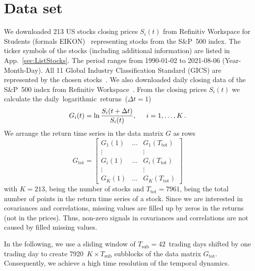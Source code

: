 \documentclass[aps, pra, groupedaddress, showkeys, twocolumn, floatfix, 10pt]{revtex4-2}
\begin{document}
\section{\label{sec:DataSet}Data set}


We downloaded 213 US stocks closing prices $S_i(t)$ from Refinitiv Workspace for Students (formals EIKON)~\cite{Refinitiv} representing stocks from the S\&P~500 index. 
The ticker symbols of the stocks (including additional information) are listed in App.~\ref{sec:ListStocks}.
The period ranges from \mbox{1990-01-02} to \mbox{2021-08-06} (Year-Month-Day).
All 11 Global Industry Classification Standard (GICS) are represented by the chosen stocks~\cite{wiki:2020:GICS}.
We also downloaded daily closing data of the S\&P~500 index from Refinitiv Workspace~\cite{Refinitiv}.
From the closing prices $S_i(t)$ we calculate the \mbox{daily logarithmic returns ($\Delta t = 1$)}
%
\begin{equation} \label{eqn:LogReturn}
	G_i(t) =  \ln  \frac{S_i(t+\Delta t)}{S_i(t)} , \hspace{0.5cm} i = 1, 
	\ldots, K
	\,.
\end{equation}
%
We arrange the return time series in the data matrix $G$ as rows
\begin{equation} \label{eqn:DatamatrixG}
	G_{\text{tot}} = \begin{bmatrix}  G_1(1) & \dots & G_1(T_{\text{tot}})  \\
		\vdots & & \vdots \\
		G_i(1) & \dots & G_i(T_{\text{tot}}) \\
		\vdots & & \vdots \\
		G_{K}(1) & \dots & G_K(T_{\text{tot}}) 
	\end{bmatrix}
\end{equation}
% 
with $K= 213$, being the number of stocks and $T_\text{tot} = 7961$,
being the total number of points in the return time series of a stock. 
Since we are interested in covariances and correlations, missing values are filled up by zeros in the returns (not in the prices).
Thus, non-zero signals in covariances and correlations are not caused by filled missing values.

In the following, we use a sliding window of $T_\text{sub} = 42$~trading days shifted by one trading day to create 7920~$K \times T_\text{sub}$  subblocks of the data matrix $G_\text{tot}$.
Consequently, we achieve a high time resolution of the temporal dynamics.
\end{document}
